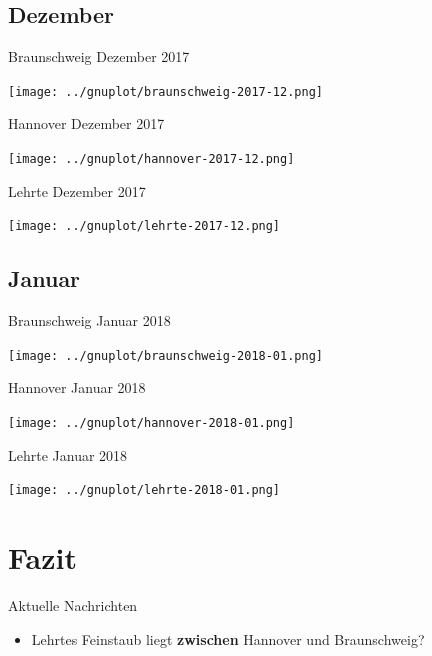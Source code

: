 \documentclass[aspectratio=169]{beamer} %
\begin{document}
\subsection{Dezember}
\begin{frame}{Braunschweig Dezember 2017}
  \begin{center}
    \texttt{[image: ../gnuplot/braunschweig-2017-12.png]}
  \end{center}
\end{frame}
\begin{frame}{Hannover Dezember 2017}
  \begin{center}
    \texttt{[image: ../gnuplot/hannover-2017-12.png]}
  \end{center}
\end{frame}
\begin{frame}{Lehrte Dezember 2017}
  \begin{center}
    \texttt{[image: ../gnuplot/lehrte-2017-12.png]}
  \end{center}
\end{frame}

\subsection{Januar}
\begin{frame}{Braunschweig Januar 2018}
  \begin{center}
    \texttt{[image: ../gnuplot/braunschweig-2018-01.png]}
  \end{center}
\end{frame}
\begin{frame}{Hannover Januar 2018}
  \begin{center}
    \texttt{[image: ../gnuplot/hannover-2018-01.png]}
  \end{center}
\end{frame}
\begin{frame}{Lehrte Januar 2018}
  \begin{center}
    \texttt{[image: ../gnuplot/lehrte-2018-01.png]}
  \end{center}
\end{frame}

\section{Fazit}
\begin{frame}{Aktuelle Nachrichten}
  \begin{itemize}
  \item Lehrtes Feinstaub liegt \textbf{zwischen} Hannover und Braunschweig?
  \end{itemize}
\end{frame}
\end{document}
